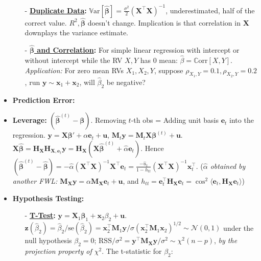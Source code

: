 \documentclass[9pt, landscape]{article}
\begin{document}
\begin{multicols*}{3}
\begin{itemize}
\begin{itemize}[leftmargin=10pt,noitemsep,topsep=0pt,partopsep=0pt]
		\item[-] \textbf{\href{https://stats.stackexchange.com/questions/216003/what-are-the-consequences-of-copying-a-data-set-for-ols}{Duplicate Data}:} $\mathrm{\mathbb{V}ar}[\widehat{\bm{\beta}}] = \frac{\sigma^2}{2} (\bm{X}^{\top} \bm{X})^{-1}$, underestimated, half of the correct value. $R^2, \bm{\widehat{\beta}}$ doesn't change. Implication is that correlation in $\bm{X}$ downplays the variance estimate.
		\item[-] \textbf{\href{https://stats.stackexchange.com/questions/2125/whats-the-difference-between-correlation-and-simple-linear-regression}{$\widehat{\bm{\beta}}$ and Correlation}:} For simple linear regression with intercept or without intercept while the RV $X, Y$ has 0 mean: $\widehat{\beta} = \mathrm{\mathbb{C}orr}\left[X,Y\right]$. \\
		\textit{Application:} For zero mean RVs $X_1, X_2, Y$, suppose $\rho_{X_1,Y}=0.1, \rho_{X_2,Y}=0.2$, run $\bm{y} \sim \bm{x}_1 + \bm{x}_2$, will $\widehat{\beta}_2$ be negative?
	\end{itemize}
	\item \textbf{Prediction Error:}
	\item \textbf{Leverage:} $(\widehat{\bm{\beta}}^{(t)} - \bm{\beta})$. Removing $t$-th obs = Adding unit basis $\bm{e}_t$ into the regression. $\bm{y} = \bm{X}\bm{\beta}' + \alpha \bm{e}_t + \bm{u}$, $\bm{M}_t\bm{y} = \bm{M}_t\bm{X}\bm{\beta}^{(t)} + \bm{u}$. \\
	$\bm{X}\widehat{\bm{\beta}} = \bm{H}_{\bm{X}}\bm{H}_{\bm{X},\bm{e}_t} \bm{y} = \bm{H}_{\bm{X}}(\bm{X}\widehat{\bm{\beta}}^{(t)} + \widehat{\alpha} \bm{e}_t)$. Hence $(\widehat{\bm{\beta}}^{(t)} - \widehat{\bm{\beta}}) = -\widehat{\alpha}(\bm{X}^{\top} \bm{X})^{-1} \bm{X}^{\top} \bm{e}_t = \frac{-\widehat{u}_t}{1-h_{tt}} (\bm{X}^{\top} \bm{X})^{-1} \bm{x}_t^{\top}$. (\textit{$\widehat{\alpha}$ obtained by another FWL: $\bm{M}_{\bm{X}}\bm{y} = \alpha\bm{M}_{\bm{X}}\bm{e}_t + \bm{u}$}, and $h_{tt} = \bm{e}_t^{\top} \bm{H}_{\bm{X}}\bm{e}_t = \cos^2 \langle \bm{e}_t, \bm{H}_{\bm{X}} \bm{e}_t \rangle$)
	\item \textbf{Hypothesis Testing:}
	\begin{itemize}[leftmargin=10pt,noitemsep,topsep=0pt,partopsep=0pt]
		\item[-] \textbf{\href{https://en.wikipedia.org/wiki/Student's_t-test}{T-Test}:} $\bm{y} = \bm{X}_1 \bm{\beta}_1 + \bm{x}_2 \beta_2 + \bm{u}$. $\bm{z}(\widehat{\beta}_2) = \widehat{\beta}_2 / \text{se}(\widehat{\beta}_2)  = \bm{x}_2^{\top} \bm{M}_1 \bm{y} / \sigma (\bm{x}_2^{\top}\bm{M}_1 \bm{x}_2)^{1/2} \sim \mathcal{N}(0,1)$ under the null hypothesis $\beta_2 = 0$; $\text{RSS} / \sigma^2 = \bm{y}^{\top} \bm{M}_{\bm{X}} \bm{y} / \sigma^2 \sim \chi^2(n-p)$, \textit{by the projection property of $\chi^2$}. The t-statistic for $\beta_2$:

\end{itemize}
\end{itemize}
\end{multicols*}
\end{document}

